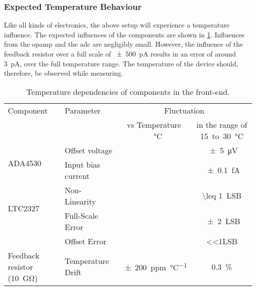 \subsubsection*{Expected Temperature Behaviour}
Like all kinds of electronics, the above setup will experience a temperature influence. The expected influences of the components are shown in \ref{tab:tempdep}. Influences from the \ac{opamp} and the \ac{adc} are negligibly small. However, the influence of the feedback resistor over a full scale of \SI{\pm500}{\pico\ampere} results in an error of around \SI{3}{\pico\ampere}, over the full temperature range. The temperature of the device should, therefore, be observed while measuring. 
\begin{table}
	\centering
	\begin{tabular}{llcc}
	\hline				
	Component & Parameter & \multicolumn{2}{c}{Fluctuation} \\
	& & vs Temperature \SI[per-mode=symbol]{}{\per\degreeCelsius} & in the range of \SI{15} to \SI{30}{\degreeCelsius} \\\hline
	\multirow{2}{*}{ADA4530 \cite{ADA4530}}& Offset voltage & & \SI{\pm5}{\micro\volt} \\
										 & Input bias current & &\SI{\pm0.1}{\femto\ampere} \\
 \multirow{2}{*}{LTC2327 \cite{LTC2327}} & Non-Linearity & &\SI{\leq 1}{\ac{LSB}}\\
	 & Full-Scale Error& & \SI{\pm2}{\ac{LSB}} \\
	 & Offset Error && \SI{<<1}{}\ac{LSB}\\
	Feedback resistor (\SI{10}{\giga\ohm}) &Temperature Drift & \SI{\pm200}{ppm\per\degreeCelsius} & \SI{0.3}{\percent} \\
	\hline 	
	\end{tabular}	%
	\caption{Temperature dependencies of components in the front-end.}
	\label{tab:tempdep}
\end{table}
